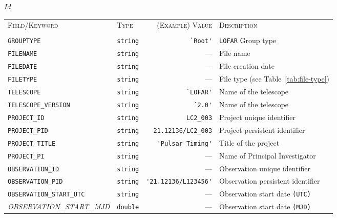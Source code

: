 \svnInfo $Id$

\begin{table}[htbp]
  \centering
  \begin{tabular}{|lp{1.5cm}rp{5cm}|}


    \hline
    \textsc{Field/Keyword} & \textsc{Type} & \textsc{(Example) Value} & \textsc{Description} \\
     &  &  & \\
    \hline \hline


    \small \verb|GROUPTYPE| & \small\verb|string| & \verb|`Root'| & \small{\verb|LOFAR|} Group type \\
    \small \verb|FILENAME| & \small\verb|string| & ---  & File name \\
    \small \verb|FILEDATE| & \small\verb|string| & ---  & File creation date \\
    \small \verb|FILETYPE| & \small\verb|string| & ---  & File type (see Table~\ref{tab:file-type}) \\
    \small \verb|TELESCOPE| & \small\verb|string| & \verb|`LOFAR'|  & Name of the telescope \\
    \small \verb|TELESCOPE_VERSION| & \small\verb|string| & \verb|`2.0'|  & Name of the telescope \\
    \small \verb|PROJECT_ID| & \small\verb|string| & \verb|LC2_003|  & Project unique identifier \\
    \small \verb|PROJECT_PID| & \small\verb|string| & \verb|21.12136/LC2_003|  & Project persistent identifier \\
    \small \verb|PROJECT_TITLE| & \small\verb|string| & \verb|'Pulsar Timing'|  & Title of the project \\
    \small \verb|PROJECT_PI| & \small\verb|string| & ---  & Name of Principal Investigator  \\
    \small \verb|OBSERVATION_ID| & \small\verb|string| & ---  & Observation unique identifier \\
    \small \verb|OBSERVATION_PID| & \small\verb|string| & \verb|'21.12136/L123456'|  & Observation persistent identifier \\
    \small \verb|OBSERVATION_START_UTC| & \small\verb|string|& ---  & Observation start date \verb|(UTC)| \\
    \small{\textit{OBSERVATION\_START\_MJD}} & \small\verb|double| & ---  & Observation start date \verb|(MJD)|\\

\end{tabular}
\end{table}
